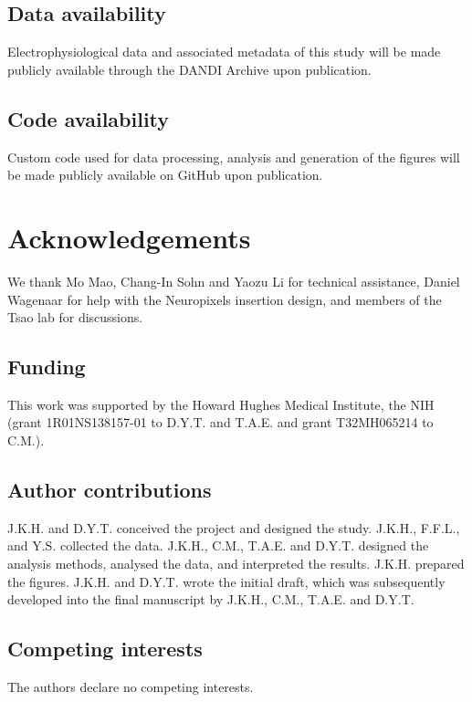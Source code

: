 \documentclass{article}
\begin{document}
\subsection*{Data availability}

Electrophysiological data and associated metadata of this study will be made publicly available through the DANDI Archive upon publication.

\subsection*{Code availability}

Custom code used for data processing, analysis and generation of the figures will be made publicly available on GitHub upon publication.

\section*{Acknowledgements}

We thank Mo Mao, Chang-In Sohn and Yaozu Li for technical assistance, Daniel Wagenaar for help with the Neuropixels insertion design, and members of the Tsao lab for discussions.

\subsection*{Funding}

This work was supported by the Howard Hughes Medical Institute, the NIH (grant 1R01NS138157-01 to D.Y.T. and T.A.E. and grant T32MH065214 to C.M.).

\subsection*{Author contributions}

J.K.H. and D.Y.T. conceived the project and designed the study. J.K.H., F.F.L., and Y.S. collected the data. J.K.H., C.M., T.A.E. and D.Y.T. designed the analysis methods, analysed the data, and interpreted the results. J.K.H. prepared the figures. J.K.H. and D.Y.T. wrote the initial draft, which was subsequently developed into the final manuscript by J.K.H., C.M., T.A.E. and D.Y.T.

\subsection*{Competing interests}

The authors declare no competing interests.
\end{document}
